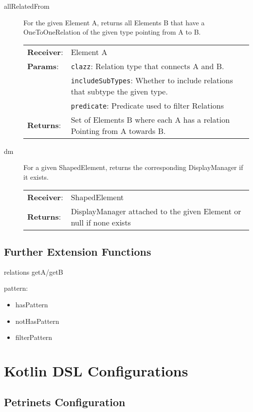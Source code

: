 \begin{description}
  \item[allRelatedFrom] For the given Element A, returns all Elements B that have a OneToOneRelation of the given type pointing from A to B.

        \begin{tabularx}{\linewidth}{ l X }
          \textbf{Receiver}: & Element A
          \\
          \textbf{Params}:   & \texttt{clazz}: Relation type that connects A and B.
          \\
                             & \texttt{includeSubTypes}: Whether to include relations that subtype the given type.
          \\
                             & \texttt{predicate}: Predicate used to filter Relations
          \\
          \textbf{Returns}:  & Set of Elements B where each A has a relation Pointing from A towards B.
        \end{tabularx}
  
  \item[dm] For a given ShapedElement, returns the corresponding DisplayManager if it exists.
  \begin{tabularx}{\linewidth}{ l X }
    \textbf{Receiver}: & ShapedElement
    \\
    \textbf{Returns}:  & DisplayManager attached to the given Element or null if none exists
  \end{tabularx}
\end{description}

\section*{Further Extension Functions}

relations getA/getB


pattern:
\begin{itemize}
  \item hasPattern
  \item notHasPattern
  \item filterPattern
\end{itemize}


\chapter{Kotlin DSL Configurations}
\section{Petrinets Configuration}
\label{app:petri}
